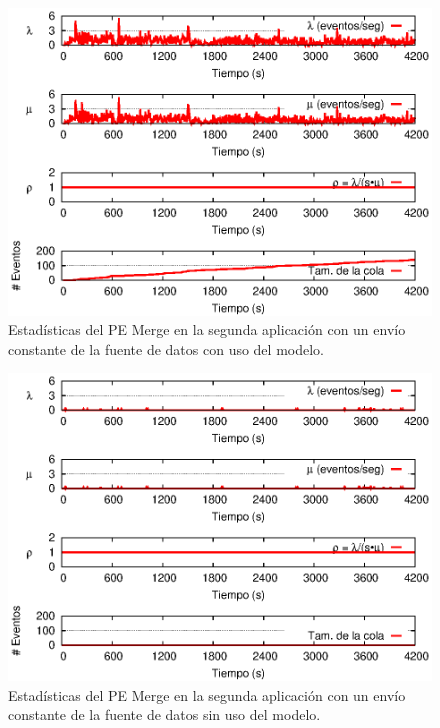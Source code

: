 \begin{figure}[!ht]
\centering
    \includegraphics[scale=1.1]{images/exp/app2/uniform/cm/statusMergePE.eps}
    \caption{Estad\'isticas del PE Merge en la segunda aplicaci\'on con un env\'io constante de la fuente de datos con uso del modelo.}
    \label{fig:app2-uniform-statusMergePE-cm}
\end{figure}

\begin{figure}[!ht]
\centering
    \includegraphics[scale=1.1]{images/exp/app2/uniform/sm/statusMergePE.eps}
    \caption{Estad\'isticas del PE Merge en la segunda aplicaci\'on con un env\'io constante de la fuente de datos sin uso del modelo.}
    \label{fig:app2-uniform-statusMergePE-sm}
\end{figure}

